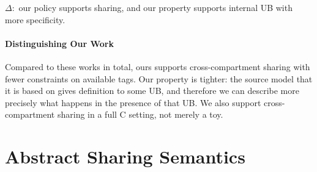 \documentclass{article}
\begin{document}
\(\Delta:\) our policy supports sharing, and our property supports
internal UB with more specificity.

\paragraph{Distinguishing Our Work}

Compared to these works in total, ours supports cross-compartment sharing with fewer constraints
on available tags. Our property is tighter: the source model that it is based on gives definition
to some UB, and therefore we can describe more precisely what happens in the presence of that UB.
We also support cross-compartment sharing in a full C setting, not merely a toy.

\section{Abstract Sharing Semantics}
\end{document}
